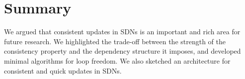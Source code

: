 \section{Summary}
\label{sec:conclusions}

We argued that consistent updates in SDNs is an important and rich area for future research. We highlighted the trade-off between the strength of the consistency property and the dependency structure it imposes, and developed minimal algorithms for loop freedom. We also sketched an architecture for consistent and quick updates in SDNs.  